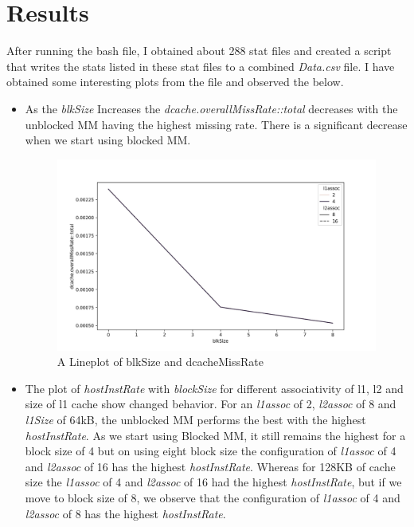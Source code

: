 \documentclass[10pt,a4paper]{article}
\begin{document}
\section{Results}
After running the bash file, I obtained about 288 stat files and created a script that writes the stats listed in these stat files to a combined \emph{Data.csv} file. I have obtained some interesting plots from the file and observed the below.
\begin{itemize}
\item As the \emph{blkSize} Increases the \emph{dcache.overallMissRate::total} decreases with the unblocked MM having the highest missing rate. There is a significant decrease when we start using blocked MM.

\begin{figure}[h!]
\includegraphics[width=\linewidth]{figures/blkSize-VS-dcacheMissRate_64KB_lineplot.jpg}
\caption{A Lineplot of blkSize and dcacheMissRate}
\end{figure}
\item The plot of \emph{hostInstRate} with \emph{blockSize} for different associativity of l1, l2 and size of l1 cache show changed behavior. For an \emph{l1assoc} of 2, \emph{l2assoc} of 8 and \emph{l1Size } of 64kB, the unblocked MM performs the best with the highest  \emph{hostInstRate}. As we start using Blocked MM, it still remains the highest for a block size of 4 but on using eight block size the configuration of \emph{l1assoc} of 4 and \emph{l2assoc} of 16 has the highest \emph{hostInstRate}. Whereas for 128KB of cache size the \emph{l1assoc} of 4 and \emph{l2assoc} of 16 had the highest \emph{hostInstRate}, but if we move to block size of 8, we observe that the configuration of \emph{l1assoc} of 4 and \emph{l2assoc} of 8 has the highest \emph{hostInstRate}.
\begin{figure}[h!]

\end{figure}
\end{itemize}
\end{document}
